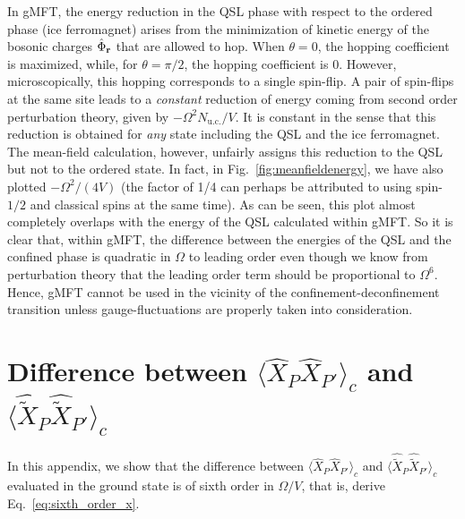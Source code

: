 \documentclass[twocolumn,superscriptaddress,amsmath,amssymb,aps,prx,nofootinbib]{revtex4-2}
\begin{document}
In gMFT, the energy reduction in the QSL phase with respect to the ordered phase (ice ferromagnet) arises from the minimization of kinetic energy of the bosonic charges $\hat{\Phi}_{\vb{r}}$ that are allowed to hop. When $\theta=0$, the hopping coefficient is maximized, while, for $\theta=\pi/2$, the hopping coefficient is 0. However, microscopically, this hopping corresponds to a single spin-flip. A pair of spin-flips at the same site leads to a \textit{constant} reduction of energy coming from second order perturbation theory, given by $-\Omega^2 N_{\text{u.c.}}/V$. It is constant in the sense that this reduction is obtained for \textit{any} state including the QSL and the ice ferromagnet. The mean-field calculation, however, unfairly assigns this reduction to the QSL but not to the ordered state. In fact, in Fig.~\ref{fig:meanfieldenergy}, we have also plotted $-\Omega^2/(4V)$ (the factor of 1/4 can perhaps be attributed to using spin-$1/2$ and classical spins at the same time). As can be seen, this plot almost completely overlaps with the energy of the QSL calculated within gMFT. So it is clear that, within gMFT, the difference between the energies of the QSL and the confined phase is quadratic in $\Omega$ to leading order even though we know from perturbation theory that the leading order term should be proportional to $\Omega^6$. Hence, gMFT cannot be used in the vicinity of the confinement-deconfinement transition unless gauge-fluctuations are properly taken into consideration.

\section{Difference between $\langle \hat{X}_P \hat{X}_{P'} \rangle_c $ and $ \langle \hat{\tilde{X}}_P \hat{\tilde{X}}_{P'} \rangle_c$}\label{app:corrections_plaq}

In this appendix, we show that the difference between $\langle \hat{X}_P \hat{X}_{P'} \rangle_c $ and $ \langle \hat{\tilde{X}}_P \hat{\tilde{X}}_{P'} \rangle_c$ evaluated in the ground state is of sixth order in $\Omega/V$, that is, derive Eq.~\eqref{eq:sixth_order_x}.
\end{document}
